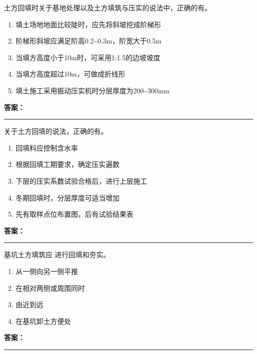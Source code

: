 \documentclass[UTF8,fontset=fandol,11pt]{ctexart}
\newcommand{\answerline}{\textcolor{answerred}{\rule{2.4cm}{0.7pt}}}
\begin{document}
\vspace{0.2em}

\begin{quizbox}[title={第 19 题}]
土方回填时关于基地处理以及土方填筑与压实的说法中，正确的有。\\
\begin{enumerate}[label=\Alph*.]
\item 填土场地地面比较陡时，应先将斜坡挖成阶梯形
\item 阶梯形斜坡应满足阶高0.2\textasciitilde{}0.3m，阶宽大于0.5m
\item 当填方高度小于10m时，可采用1:1.5的边坡坡度
\item 当填方高度超过10m，可做成折线形
\item 填土施工采用振动压实机时分层厚度为200\textasciitilde{}300mm
\end{enumerate}
\textbf{\textcolor{answerred}{答案：}} \answerline
\end{quizbox}

\vspace{0.2em}

\begin{quizbox}[title={第 20 题}]
关于土方回填的说法，正确的有。\\
\begin{enumerate}[label=\Alph*.]
\item 回填料应控制含水率
\item 根据回填工期要求，确定压实遍数
\item 下层的压实系数试验合格后，进行上层施工
\item 冬期回填时，分层厚度可适当增加
\item 先有取样点位布置图，后有试验结果表
\end{enumerate}
\textbf{\textcolor{answerred}{答案：}} \answerline
\end{quizbox}

\vspace{0.2em}

\begin{quizbox}[title={第 21 题}]
基坑土方填筑应 进行回填和夯实。\\
\begin{enumerate}[label=\Alph*.]
\item 从一侧向另一侧平推
\item 在相对两侧或周围同时
\item 由近到远
\item 在基坑卸土方便处
\end{enumerate}
\textbf{\textcolor{answerred}{答案：}} \answerline
\end{quizbox}
\end{document}
